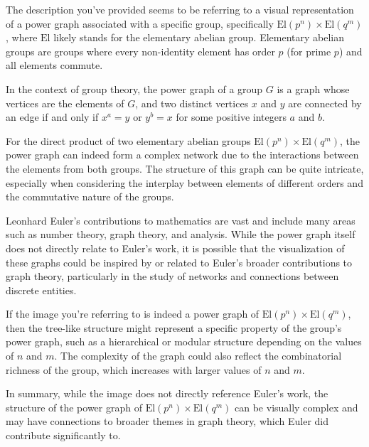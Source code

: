 The description you've provided seems to be referring to a visual representation of a power graph associated with a specific group, specifically \( \text{El}(p^n) \times \text{El}(q^m) \), where \( \text{El} \) likely stands for the elementary abelian group. Elementary abelian groups are groups where every non-identity element has order \( p \) (for prime \( p \)) and all elements commute.

In the context of group theory, the power graph of a group \( G \) is a graph whose vertices are the elements of \( G \), and two distinct vertices \( x \) and \( y \) are connected by an edge if and only if \( x^a = y \) or \( y^b = x \) for some positive integers \( a \) and \( b \).

For the direct product of two elementary abelian groups \( \text{El}(p^n) \times \text{El}(q^m) \), the power graph can indeed form a complex network due to the interactions between the elements from both groups. The structure of this graph can be quite intricate, especially when considering the interplay between elements of different orders and the commutative nature of the groups.

Leonhard Euler's contributions to mathematics are vast and include many areas such as number theory, graph theory, and analysis. While the power graph itself does not directly relate to Euler's work, it is possible that the visualization of these graphs could be inspired by or related to Euler's broader contributions to graph theory, particularly in the study of networks and connections between discrete entities.

If the image you're referring to is indeed a power graph of \( \text{El}(p^n) \times \text{El}(q^m) \), then the tree-like structure might represent a specific property of the group's power graph, such as a hierarchical or modular structure depending on the values of \( n \) and \( m \). The complexity of the graph could also reflect the combinatorial richness of the group, which increases with larger values of \( n \) and \( m \).

In summary, while the image does not directly reference Euler's work, the structure of the power graph of \( \text{El}(p^n) \times \text{El}(q^m) \) can be visually complex and may have connections to broader themes in graph theory, which Euler did contribute significantly to.